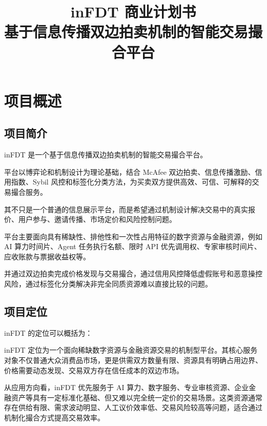 \documentclass[UTF8,a4paper,12pt]{ctexart}
\title{\textbf{inFDT 商业计划书}\\[0.5em]
\large 基于信息传播双边拍卖机制的智能交易撮合平台}
\author{}
\date{}
\begin{document}
\maketitle

\newpage
\setcounter{tocdepth}{3} %
\tableofcontents

\newpage

\section{项目概述}


\subsection{项目简介}


inFDT 是一个基于信息传播双边拍卖机制的智能交易撮合平台。

平台以博弈论和机制设计为理论基础，结合 McAfee 双边拍卖、信息传播激励、信用指数、Sybil 风控和标签化分类方法，为买卖双方提供高效、可信、可解释的交易撮合服务。

其不只是一个普通的信息展示平台，而是希望通过机制设计解决交易中的真实报价、用户参与、邀请传播、市场定价和风险控制问题。

平台主要面向具有稀缺性、排他性和一次性占用特征的数字资源与金融资源，例如 AI 算力时间片、Agent 任务执行名额、限时 API 优先调用权、专家审核时间片、应收账款与票据收益权等。

并通过双边拍卖完成价格发现与交易撮合，通过信用风控降低虚假账号和恶意操控风险，通过标签化分类解决非完全同质资源难以直接比较的问题。

\subsection{项目定位}

inFDT 的定位可以概括为：

inFDT 定位为一个面向稀缺数字资源与金融资源交易的机制型平台。其核心服务对象不仅普通大众消费品市场，更是供需双方数量有限、资源具有明确占用边界、价格需要动态发现、交易双方存在信任成本的双边市场。

从应用方向看，inFDT 优先服务于 AI 算力、数字服务、专业审核资源、企业金融资产等具有一定标准化基础、但又难以完全统一定价的交易场景。这类资源通常存在供给有限、需求波动明显、人工议价效率低、交易风险较高等问题，适合通过机制化撮合方式提高交易效率。
\end{document}

